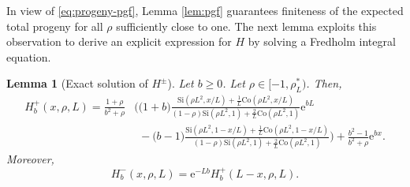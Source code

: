 \documentclass[a4paper, a4wide, 10pt, reqno]{amsart}
\theoremstyle{plain}
\newtheorem{lemma}[theorem]{Lemma}
\theoremstyle{definition}
\numberwithin{equation}{section}
\newcommand{\re}{{\mathrm e}}
\newcommand{\Co}{{\mathrm{Co}}}
\newcommand{\Si}{{\mathrm{Si}}}
\begin{document}
In view of \eqref{eq:progeny-pgf},  Lemma \ref{lem:pgf} guarantees finiteness of the expected total progeny for all $\rho$ sufficiently close to one. The next lemma exploits this observation to derive an explicit expression for $H$ by solving a Fredholm integral equation.
\begin{lemma}[Exact solution of $H^\pm$]\label{lem:exponential-moments1}
Let $b\ge 0$. Let $\rho\in[-1, \rho^*_L)$.  
Then,
\begin{align} \label{eq:exp-moments-pos}
    H_{b}^+(x,\rho, L)
    = \frac{1+\rho}{b^2 +\rho}&\Bigg(\big(1+b\big)\frac{\Si(\rho L^2,x/L) + \frac{1}{ L}\Co(\rho L^2, x/L)}{(1-\rho)\Si(\rho L^2, 1) + \frac{2}{L}\Co(\rho L^2, 1)}\re^{bL} \\ &\hspace{5pt}- \big(b-1\big)\frac{\Si(\rho L^2, 1-x/L) + \frac{1}{L}\Co(\rho L^2, 1-x/L)}{(1-\rho)\Si(\rho L^2, 1) + \frac{2}{L}\Co(\rho L^2, 1)}\Bigg) + \frac{b^2-1}{b^2+\rho}\re^{ bx}\nonumber.
    \end{align}
Moreover, 
\begin{equation}\label{eq:h-minus}
H^-_{b}(x, \rho, L)=\re^{-Lb}H^+_{b}(L-x, \rho, L).
\end{equation}
\end{lemma}
\end{document}

